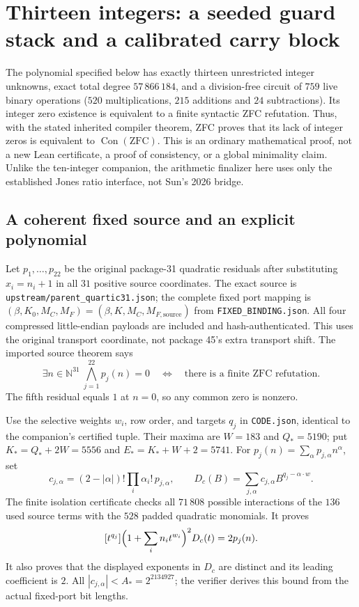\section{Thirteen integers: a seeded guard stack and a calibrated carry block}
\label{sec:jones-seeded}

The polynomial specified below has exactly thirteen unrestricted integer
unknowns, exact total degree $57\,866\,184$, and a division-free circuit of
$759$ live binary operations ($520$ multiplications, $215$ additions and
$24$ subtractions). Its integer zero existence is equivalent to a finite
syntactic ZFC refutation. Thus, with the stated inherited compiler theorem,
ZFC proves that its lack of integer zeros is equivalent to
$\operatorname{Con}(\mathrm{ZFC})$. This is an ordinary mathematical proof,
not a new Lean certificate, a proof of consistency, or a global minimality
claim. Unlike the ten-integer companion, the arithmetic finalizer here uses
only the established Jones ratio interface, not Sun's 2026 bridge.

\subsection{A coherent fixed source and an explicit polynomial}
Let $p_1,\ldots,p_{22}$ be the original package-31 quadratic residuals after
substituting $x_i=n_i+1$ in all $31$ positive source coordinates. The exact
source is \texttt{upstream/parent\_quartic31.json}; the complete fixed port
mapping is $(\beta,K_0,M_C,M_F)=(\beta,K,M_C,M_{F,\mathrm{source}})$ from
\texttt{FIXED\_BINDING.json}. All four compressed little-endian payloads are
included and hash-authenticated. This uses the original transport coordinate,
not package 45's extra transport shift. The imported source theorem says
\[
 \exists n\in\mathbb N^{31}\ \bigwedge_{j=1}^{22}p_j(n)=0
 \quad\Longleftrightarrow\quad
 \text{there is a finite ZFC refutation}.
\]
The fifth residual equals $1$ at $n=0$, so any common zero is nonzero.

Use the selective weights $w_i$, row order, and targets $q_j$ in
\texttt{CODE.json}, identical to the companion's certified tuple.
Their maxima are $W=183$ and $Q_*=5190$; put $K_*=Q_*+2W=5556$ and
$E_*=K_*+W+2=5741$. For
$p_j(n)=\sum_\alpha p_{j,\alpha}n^\alpha$, set
\[
 c_{j,\alpha}=(2-|\alpha|)!\prod_i\alpha_i!\,p_{j,\alpha},\qquad
 D_c(B)=\sum_{j,\alpha}c_{j,\alpha}B^{q_j-\alpha\cdot w}.
\]
The finite isolation certificate checks all $71\,808$ possible interactions
of the $136$ used source terms with the $528$ padded quadratic monomials.
It proves
\[
 [t^{q_j}]\Bigl(1+\sum_i n_it^{w_i}\Bigr)^2D_c(t)=2p_j(n).
\]
It also proves that the displayed exponents in $D_c$ are distinct and its
leading coefficient is $2$. All $|c_{j,\alpha}|<A_*=2^{2134927}$;
the verifier derives this bound from the actual fixed-port bit lengths.

